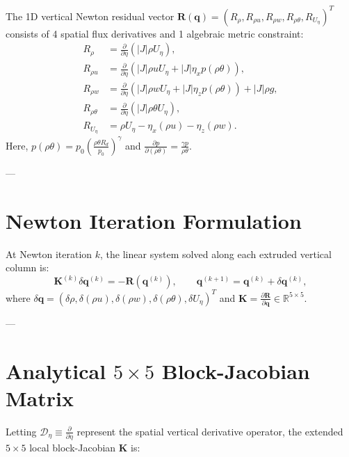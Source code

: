 \documentclass[11pt,a4paper]{article}
\begin{document}
		The 1D vertical Newton residual vector $\mathbf{R}(\boldsymbol{q}) = (R_\rho, R_{\rho u}, R_{\rho w}, R_{\rho \theta}, R_{U_\eta})^T$ consists of 4 spatial flux derivatives and 1 algebraic metric constraint:
		\begin{align}
			R_\rho &= \frac{\partial}{\partial \eta} \left( |J| \rho U_\eta \right), \\[6pt]
			R_{\rho u} &= \frac{\partial}{\partial \eta} \left( |J| \rho u U_\eta + |J| \eta_x p(\rho\theta) \right), \\[6pt]
			R_{\rho w} &= \frac{\partial}{\partial \eta} \left( |J| \rho w U_\eta + |J| \eta_z p(\rho\theta) \right) + |J| \rho g, \\[6pt]
			R_{\rho \theta} &= \frac{\partial}{\partial \eta} \left( |J| \rho \theta U_\eta \right), \\[6pt]
			R_{U_\eta} &= \rho U_\eta - \eta_x (\rho u) - \eta_z (\rho w).
		\end{align}
		Here, $p(\rho\theta) = p_0 \left( \frac{\rho\theta R_d}{p_0} \right)^\gamma$ and $\frac{\partial p}{\partial (\rho\theta)} = \frac{\gamma p}{\rho\theta}$.
		
		---
		
		\section{Newton Iteration Formulation}
		
		At Newton iteration $k$, the linear system solved along each extruded vertical column is:
		\begin{equation}
			\mathbf{K}^{(k)} \delta \boldsymbol{q}^{(k)} = -\mathbf{R}(\boldsymbol{q}^{(k)}), \qquad \boldsymbol{q}^{(k+1)} = \boldsymbol{q}^{(k)} + \delta \boldsymbol{q}^{(k)},
		\end{equation}
		where $\delta \boldsymbol{q} = (\delta \rho, \delta(\rho u), \delta(\rho w), \delta(\rho \theta), \delta U_\eta)^T$ and $\mathbf{K} = \frac{\partial \mathbf{R}}{\partial \boldsymbol{q}} \in \mathbb{R}^{5 \times 5}$.
		
		---
		
		\section{Analytical $5 \times 5$ Block-Jacobian Matrix}
		
		Letting $\mathcal{D}_\eta \equiv \frac{\partial}{\partial \eta}$ represent the spatial vertical derivative operator, the extended $5 \times 5$ local block-Jacobian $\mathbf{K}$ is:
		
\end{document}
